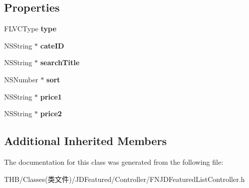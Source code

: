\subsection*{Properties}
\begin{DoxyCompactItemize}
\item 
\mbox{\label{interface_f_n_j_d_featured_list_controller_ac747c067ccdd27dc9e178e5dacb22d27}} 
F\+L\+V\+C\+Type {\bfseries type}
\item 
\mbox{\label{interface_f_n_j_d_featured_list_controller_a8549c31fda7700afbf595dd40262deb2}} 
N\+S\+String $\ast$ {\bfseries cate\+ID}
\item 
\mbox{\label{interface_f_n_j_d_featured_list_controller_a94bd98774b597f6a9dd2702ae3a6564a}} 
N\+S\+String $\ast$ {\bfseries search\+Title}
\item 
\mbox{\label{interface_f_n_j_d_featured_list_controller_ac0856fc55df6934f0d868b3382fd74ed}} 
N\+S\+Number $\ast$ {\bfseries sort}
\item 
\mbox{\label{interface_f_n_j_d_featured_list_controller_a93969b42a3315a22ae3f2dce0d6e822e}} 
N\+S\+String $\ast$ {\bfseries price1}
\item 
\mbox{\label{interface_f_n_j_d_featured_list_controller_a6eadeeb4bbfccda927a5e93be69e93b3}} 
N\+S\+String $\ast$ {\bfseries price2}
\end{DoxyCompactItemize}
\subsection*{Additional Inherited Members}


The documentation for this class was generated from the following file\+:\begin{DoxyCompactItemize}
\item 
T\+H\+B/\+Classes(类文件)/\+J\+D\+Featured/\+Controller/F\+N\+J\+D\+Featured\+List\+Controller.\+h\end{DoxyCompactItemize}
